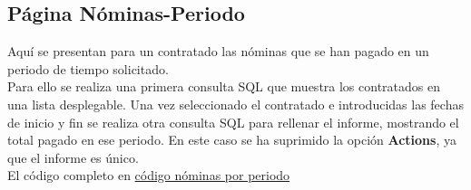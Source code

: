 \subsection{Página Nóminas-Periodo}
Aquí se presentan para un contratado las nóminas que se han pagado en un periodo de tiempo solicitado.\\

Para ello se realiza una primera consulta \acrshort{SQL} que muestra los contratados en una lista desplegable.
Una vez seleccionado el contratado e introducidas las fechas de inicio y fin se realiza otra consulta \acrshort{SQL} para rellenar el informe, mostrando el total pagado en ese periodo. En este caso se ha suprimido la opción \textbf{Actions}, ya que el informe es único.\\

El código completo en  \href{https://github.com/far0010/TFGUBU-Fran_Arroyo/blob/main/project-docs/memoria/sql/consultas_nom_periodo.sql}{código nóminas por periodo}